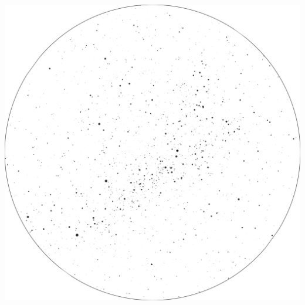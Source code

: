 \documentclass{./SAS-class-skygen}
\begin{document}
	\vspace{0.5cm}
    \begin{center}
    \includegraphics[width=\textwidth]{./pics/skychart49.png}
    \end{center}
    
    
\end{document}
